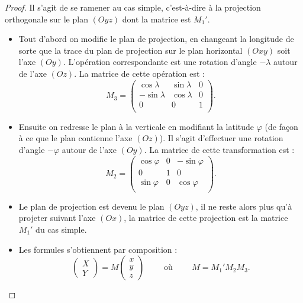 \documentclass[11pt,class=report,crop=false]{standalone}
\begin{document}
\begin{proof}
Il s'agit de se ramener au cas simple, c'est-à-dire à la projection orthogonale sur le plan $(Oyz)$ dont la matrice est $M_1'$.

\begin{itemize}
  \item Tout d'abord on modifie le plan de projection, en changeant la longitude de sorte que la trace du plan de projection sur le plan horizontal $(Oxy)$ soit l'axe $(Oy)$. L'opération correspondante est une rotation d'angle $-\lambda$ autour de l'axe $(Oz)$. La matrice de cette opération est :
  $$M_3 = 
  \begin{pmatrix}
  \cos\lambda & \sin\lambda & 0\\
  -\sin\lambda & \cos\lambda & 0\\
  0&0&1\\
  \end{pmatrix}.
  $$



  \item Ensuite on redresse le plan à la verticale en modifiant la latitude $\varphi$ (de façon à ce que le plan contienne l'axe $(Oz)$).
  Il s'agit d'effectuer une rotation d'angle $-\varphi$ autour de l'axe $(Oy)$.
  La matrice de cette transformation est :
  $$M_2 = 
  \begin{pmatrix}
  \cos\varphi & 0 & -\sin\varphi \\
   0&1&0\\
  \sin\varphi & 0 & \cos\varphi\\
  \end{pmatrix}.
  $$
  

  \item Le plan de projection est devenu le plan $(Oyz)$, il ne reste alors plus qu'à projeter suivant l'axe $(Ox)$, la matrice de cette projection est la matrice $M_1'$ du cas simple. 

  \item Les formules s'obtiennent par composition : 
  $$\begin{pmatrix}X\\Y\end{pmatrix} = M \begin{pmatrix}x\\y\\z\end{pmatrix} 
  \qquad \text{ où } \qquad 
  M = M_1' M_2 M_3.
  $$
\end{itemize}

\end{proof}
\end{document}
